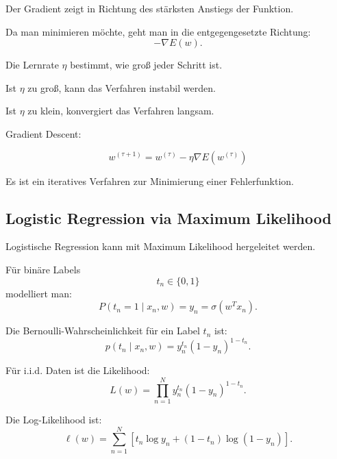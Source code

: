 \documentclass[11pt,a4paper]{scrartcl}
\begin{document}
\begin{solutionbox}
    Der Gradient zeigt in Richtung des stärksten Anstiegs der Funktion.

    Da man minimieren möchte, geht man in die entgegengesetzte Richtung:
    \[
        -\nabla E(w).
    \]

    Die Lernrate \(\eta\) bestimmt, wie groß jeder Schritt ist.

    Ist \(\eta\) zu groß, kann das Verfahren instabil werden.

    Ist \(\eta\) zu klein, konvergiert das Verfahren langsam.
\end{solutionbox}

\begin{answerbox}
    Gradient Descent:

    \[
        \boxed{
            w^{(\tau+1)}
            =
            w^{(\tau)}
            -
            \eta
            \nabla E(w^{(\tau)})
        }
    \]

    Es ist ein iteratives Verfahren zur Minimierung einer Fehlerfunktion.
\end{answerbox}

\subsection{Logistic Regression via Maximum Likelihood}

\begin{notebox}
    Logistische Regression kann mit Maximum Likelihood hergeleitet werden.

    Für binäre Labels
    \[
        t_n \in \{0,1\}
    \]
    modelliert man:
    \[
        P(t_n=1 \mid x_n,w)
        =
        y_n
        =
        \sigma(w^Tx_n).
    \]
\end{notebox}

\begin{calculationbox}
    Die Bernoulli-Wahrscheinlichkeit für ein Label \(t_n\) ist:
    \[
        p(t_n \mid x_n,w)
        =
        y_n^{t_n}
        (1-y_n)^{1-t_n}.
    \]

    Für i.i.d. Daten ist die Likelihood:
    \[
        L(w)
        =
        \prod_{n=1}^{N}
        y_n^{t_n}
        (1-y_n)^{1-t_n}.
    \]

    Die Log-Likelihood ist:
    \[
        \ell(w)
        =
        \sum_{n=1}^{N}
        \left[
            t_n\log y_n
            +
            (1-t_n)\log(1-y_n)
        \right].
    \]
\end{calculationbox}
\end{document}
